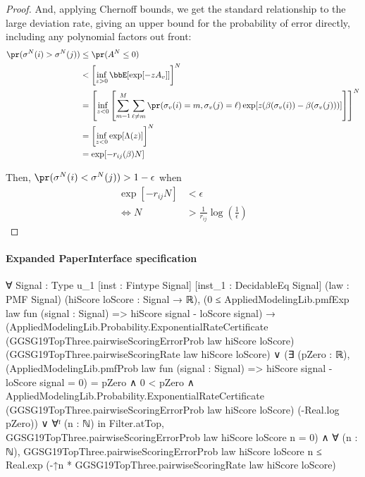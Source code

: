 \documentclass[10pt]{article}
\begin{document}
\begin{ReviewVerbatim}
\begin{proof}
	And, applying Chernoff bounds, we get the standard relationship to the large deviation rate, giving an upper bound for the probability of error directly, including any polynomial factors out front:
		\begin{align*}
	\pr(\sigma^N(i) > \sigma^N(j)) &\leq \pr(A^N \leq 0) \\
	&< \left[\inf_{z>0}\bbE[\exp[-zA_v]]\right]^N\\
%
	&= \left[\inf_{z<0}\left[\sum_{m=1}^M \sum_{\ell\neq m} \pr(\sigma_v(i) = m, \sigma_v(j)=\ell) \exp[ z(\beta(\sigma_v(i)) - \beta(\sigma_v(j)))]\right]\right]^N\\
		&= \left[\inf_{z<0} \exp[\Lambda(z)]\right]^N\\
		&= \exp[-r_{ij}(\beta)N]
	\end{align*}

Then, $\pr(\sigma^N(i) < \sigma^N(j)) > 1-\epsilon$ when
\begin{align*}
\exp[-r_{ij}N] &< \epsilon\\
\iff N&> \frac{1}{r_{ij}}\log\left(\frac{1}{\epsilon}\right)
\end{align*}

\end{proof}
\end{ReviewVerbatim}



\paragraph{Expanded PaperInterface specification}
\begin{ReviewVerbatim}
∀ {Signal : Type u_1} [inst : Fintype Signal] [inst_1 : DecidableEq Signal] (law : PMF Signal)
  (hiScore loScore : Signal → ℝ),
  (0 ≤ AppliedModelingLib.pmfExp law fun (signal : Signal) => hiScore signal - loScore signal) →
    (AppliedModelingLib.Probability.ExponentialRateCertificate
          (GGSG19TopThree.pairwiseScoringErrorProb law hiScore loScore)
          (GGSG19TopThree.pairwiseScoringRate law hiScore loScore) ∨
        (∃ (pZero : ℝ),
            (AppliedModelingLib.pmfProb law fun (signal : Signal) => hiScore signal - loScore signal = 0) = pZero ∧
              0 < pZero ∧
                AppliedModelingLib.Probability.ExponentialRateCertificate
                  (GGSG19TopThree.pairwiseScoringErrorProb law hiScore loScore) (-Real.log pZero)) ∨
          ∀ᶠ (n : ℕ) in Filter.atTop, GGSG19TopThree.pairwiseScoringErrorProb law hiScore loScore n = 0) ∧
      ∀ (n : ℕ),
        GGSG19TopThree.pairwiseScoringErrorProb law hiScore loScore n ≤
          Real.exp (-↑n * GGSG19TopThree.pairwiseScoringRate law hiScore loScore)
\end{ReviewVerbatim}
\end{document}
